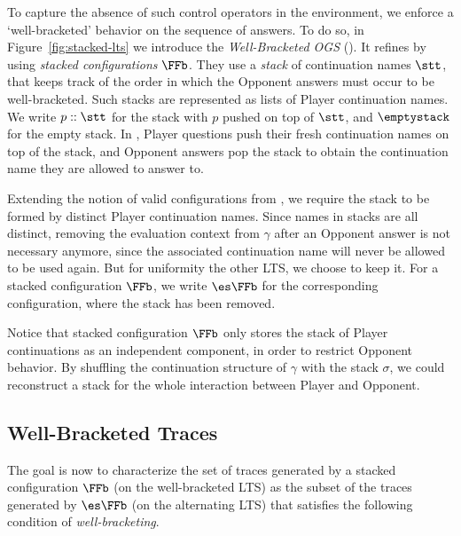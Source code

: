 To capture the absence of such control operators in the environment,
we enforce a `well-bracketed' behavior on the sequence of answers.
To do so, in Figure~\ref{fig:stacked-lts} we introduce the  \emph{Well-Bracketed OGS} (\WBOGS).  
It refines \AOGS by using \emph{stacked configurations} $\FFb$.
They use a \emph{stack} of continuation names $\stt$, that keeps track
of the order in which the Opponent answers must occur to be well-bracketed.
Such stacks
are represented as lists of Player continuation names.
We write $p:: \stt$ for the stack with $p$ pushed on top of $\stt$, 
and $\emptystack$ for the empty stack.
In \WBOGS, Player questions push their fresh continuation names on top of the stack, and
Opponent answers pop the stack to obtain the continuation name they are allowed to answer to.

Extending the notion of valid configurations from \AOGS,
we require the stack to be formed by distinct Player continuation names.
Since names in stacks are all distinct, removing the evaluation context 
from $\gamma$ after an Opponent answer is not necessary anymore, since the 
associated continuation name will never be allowed to be used again. 
But for uniformity \wrt the other LTS, we choose to keep it.
For a stacked configuration $\FFb$, we write $\es \FFb$ for the corresponding \AOGS
configuration, where the stack has been removed.

Notice that stacked configuration $\FFb$
only stores the stack of Player continuations as an independent component,
in order to restrict Opponent behavior.
By shuffling the continuation structure of $\gamma$ with
the stack $\sigma$, we could reconstruct
a stack for the whole interaction between Player and Opponent.

\subsection{Well-Bracketed Traces}

The goal is now to characterize the set of traces generated by a stacked configuration
$\FFb$ (on the well-bracketed LTS) as the subset of the traces generated by $\es \FFb$ 
(on the alternating LTS) that satisfies the following condition of \emph{well-bracketing}.

